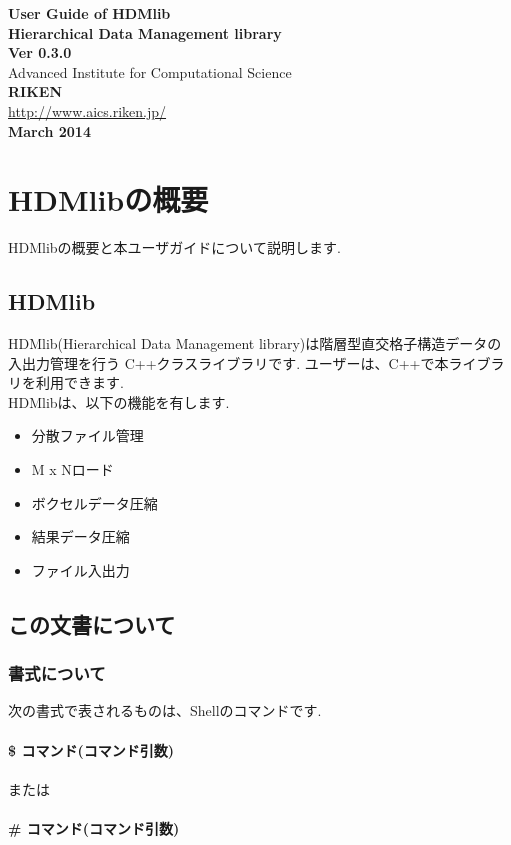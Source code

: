 \documentclass[twoside]{jbook}
\begin{document}
\begin{titlepage}
\vspace*{7cm}
\begin{center}%
{\huge \bf User Guide of HDMlib\\}
\vspace*{0.5cm}
{\small \bf Hierarchical Data Management library \\}
\vspace*{1cm}
{\small \bf Ver 0.3.0\\}
\vspace*{1cm}
{Advanced Institute for Computational Science \\}
\vspace*{0.5cm}
{\bf RIKEN\\}
\vspace*{1cm}
{\href{http://www.aics.riken.jp/}{http://www.aics.riken.jp/}\\}
\vspace*{1cm}
{\small \bf March 2014}\\
\end{center}
\end{titlepage}

\tableofcontents

\chapter{HDMlibの概要}
HDMlibの概要と本ユーザガイドについて説明します. 
\newpage
\section{HDMlib}
HDMlib(Hierarchical Data Management library)は階層型直交格子構造データの入出力管理を行う C++クラスライブラリです. ユーザーは、C++で本ライブラリを利用できます. \\
HDMlibは、以下の機能を有します. 
\begin{itemize}
	\item 分散ファイル管理
	\item M x Nロード
	\item ボクセルデータ圧縮
	\item 結果データ圧縮
	\item ファイル入出力
\end{itemize}

\section{この文書について}
\subsection{書式について}
次の書式で表されるものは、Shellのコマンドです. \\\\
{\bf \$ コマンド(コマンド引数)\\\\}
または\\\\
{\bf \# コマンド(コマンド引数)\\\\}
\end{document}
